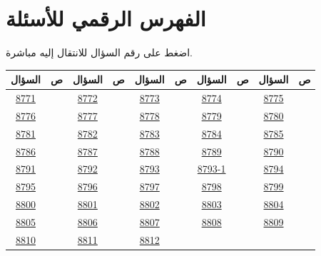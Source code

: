 \documentclass[11pt,a4paper]{article}
\newcommand{\en}[1]{\textenglish{#1}}
\begin{document}
\newpage
\section{الفهرس الرقمي للأسئلة}
اضغط على رقم السؤال للانتقال إليه مباشرة.

{\small
\begin{longtable}{|c|c||c|c||c|c||c|c||c|c|}
\hline
\textbf{السؤال} & \textbf{ص} & \textbf{السؤال} & \textbf{ص} & \textbf{السؤال} & \textbf{ص} & \textbf{السؤال} & \textbf{ص} & \textbf{السؤال} & \textbf{ص}\\\hline\endhead
\hyperref[q8771]{\en{8771}} & \pageref{q8771} & \hyperref[q8772]{\en{8772}} & \pageref{q8772} & \hyperref[q8773]{\en{8773}} & \pageref{q8773} & \hyperref[q8774]{\en{8774}} & \pageref{q8774} & \hyperref[q8775]{\en{8775}} & \pageref{q8775}\\\hline
\hyperref[q8776]{\en{8776}} & \pageref{q8776} & \hyperref[q8777]{\en{8777}} & \pageref{q8777} & \hyperref[q8778]{\en{8778}} & \pageref{q8778} & \hyperref[q8779]{\en{8779}} & \pageref{q8779} & \hyperref[q8780]{\en{8780}} & \pageref{q8780}\\\hline
\hyperref[q8781]{\en{8781}} & \pageref{q8781} & \hyperref[q8782]{\en{8782}} & \pageref{q8782} & \hyperref[q8783]{\en{8783}} & \pageref{q8783} & \hyperref[q8784]{\en{8784}} & \pageref{q8784} & \hyperref[q8785]{\en{8785}} & \pageref{q8785}\\\hline
\hyperref[q8786]{\en{8786}} & \pageref{q8786} & \hyperref[q8787]{\en{8787}} & \pageref{q8787} & \hyperref[q8788]{\en{8788}} & \pageref{q8788} & \hyperref[q8789]{\en{8789}} & \pageref{q8789} & \hyperref[q8790]{\en{8790}} & \pageref{q8790}\\\hline
\hyperref[q8791]{\en{8791}} & \pageref{q8791} & \hyperref[q8792]{\en{8792}} & \pageref{q8792} & \hyperref[q8793]{\en{8793}} & \pageref{q8793} & \hyperref[q8793-1]{\en{8793-1}} & \pageref{q8793-1} & \hyperref[q8794]{\en{8794}} & \pageref{q8794}\\\hline
\hyperref[q8795]{\en{8795}} & \pageref{q8795} & \hyperref[q8796]{\en{8796}} & \pageref{q8796} & \hyperref[q8797]{\en{8797}} & \pageref{q8797} & \hyperref[q8798]{\en{8798}} & \pageref{q8798} & \hyperref[q8799]{\en{8799}} & \pageref{q8799}\\\hline
\hyperref[q8800]{\en{8800}} & \pageref{q8800} & \hyperref[q8801]{\en{8801}} & \pageref{q8801} & \hyperref[q8802]{\en{8802}} & \pageref{q8802} & \hyperref[q8803]{\en{8803}} & \pageref{q8803} & \hyperref[q8804]{\en{8804}} & \pageref{q8804}\\\hline
\hyperref[q8805]{\en{8805}} & \pageref{q8805} & \hyperref[q8806]{\en{8806}} & \pageref{q8806} & \hyperref[q8807]{\en{8807}} & \pageref{q8807} & \hyperref[q8808]{\en{8808}} & \pageref{q8808} & \hyperref[q8809]{\en{8809}} & \pageref{q8809}\\\hline
\hyperref[q8810]{\en{8810}} & \pageref{q8810} & \hyperref[q8811]{\en{8811}} & \pageref{q8811} & \hyperref[q8812]{\en{8812}} & \pageref{q8812} &  &  &  & \\\hline
\end{longtable}
}
\end{document}

